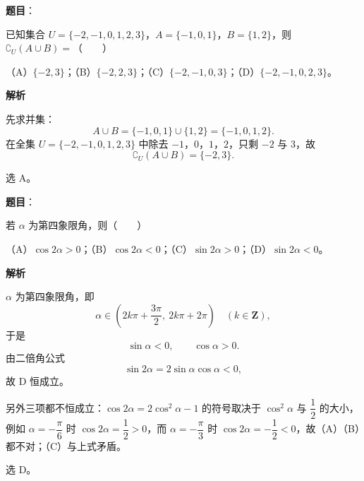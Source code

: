 

\begin{answer}

\textbf{题目}：

已知集合 $U=\{-2,-1,0,1,2,3\}$，$A=\{-1,0,1\}$，$B=\{1,2\}$，则 $\complement_U(A\cup B)=$\mbox{（　　）}

（A）$\{-2,3\}$；（B）$\{-2,2,3\}$；（C）$\{-2,-1,0,3\}$；（D）$\{-2,-1,0,2,3\}$。

\textbf{解析}

先求并集：
\nopagebreak[4]
\[A\cup B=\{-1,0,1\}\cup\{1,2\}=\{-1,0,1,2\}.\]
在全集 $U=\{-2,-1,0,1,2,3\}$ 中除去 $-1$，$0$，$1$，$2$，只剩 $-2$ 与 $3$，故
\nopagebreak[4]
\[\complement_U(A\cup B)=\{-2,3\}.\]

选 A。


\end{answer}
\begin{answer}

\textbf{题目}：

若 $\alpha$ 为第四象限角，则\mbox{（　　）}

（A）$\cos2\alpha>0$；（B）$\cos2\alpha<0$；（C）$\sin2\alpha>0$；（D）$\sin2\alpha<0$。

\textbf{解析}

$\alpha$ 为第四象限角，即
\nopagebreak[4]
\[\alpha\in\left(2k\pi+\frac{3\pi}2,\ 2k\pi+2\pi\right)\quad(k\in\mathbf Z),\]
于是
\nopagebreak[4]
\[\sin\alpha<0,\qquad \cos\alpha>0 .\]
由二倍角公式
\nopagebreak[4]
\[\sin2\alpha=2\sin\alpha\cos\alpha<0,\]
故 D 恒成立。

另外三项都不恒成立：$\cos2\alpha=2\cos^2\alpha-1$ 的符号取决于 $\cos^2\alpha$ 与 $\dfrac12$ 的大小，例如 $\alpha=-\dfrac\pi6$ 时 $\cos2\alpha=\dfrac12>0$，而 $\alpha=-\dfrac\pi3$ 时 $\cos2\alpha=-\dfrac12<0$，故（A）（B）都不对；（C）与上式矛盾。

选 D。


\end{answer}
